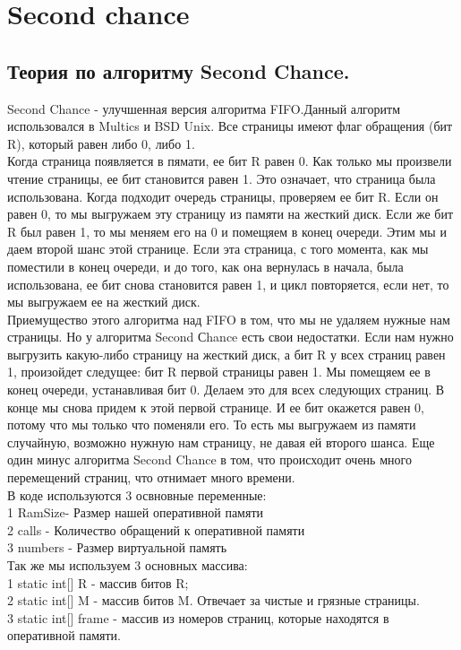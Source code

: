 \section{Second chance}

\subsection{Теория по алгоритму Second Chance.} 

Second Chance - улучшенная версия алгоритма FIFO.Данный алгоритм использовался в Multics и BSD Unix. Все страницы имеют флаг обращения (бит R), который равен либо 0, либо 1.\\
Когда страница появляется в пямати, ее бит R равен 0. Как только мы произвели чтение страницы, ее бит становится равен 1. Это означает, что страница была использована. Когда подходит очередь страницы, проверяем ее бит R. Если он равен 0, то мы выгружаем эту страницу из памяти на жесткий диск. Если же бит R был равен 1, то мы меняем его на 0 и помещяем в конец очереди. Этим мы и даем второй шанс этой странице. Если эта страница, с того момента, как мы поместили в конец очереди, и до того, как она вернулась в начала, была использована, ее бит снова становится равен 1, и цикл  повторяется, если нет, то мы выгружаем ее на жесткий диск.\\
 Приемущество этого алгоритма над FIFO в том, что мы не удаляем нужные нам страницы. Но у алгоритма Second Сhance есть свои недостатки. Если нам нужно выгрузить какую-либо страницу на жесткий диск, а бит R у всех страниц равен 1, произойдет следущее: бит R первой страницы равен 1. Мы помещяем ее в конец очереди, устанавливая бит 0. Делаем это для всех следующих страниц. В конце мы снова придем к этой первой странице. И ее бит окажется равен 0, потому что мы только что поменяли его. То есть мы выгружаем из памяти случайную, возможно нужную нам страницу, не давая ей второго шанса. Еще один минус алгоритма Second Chance  в том, что происходит очень много перемещений страниц, что отнимает много времени.\\
 В коде используются 3 освновные переменные: \\
 1 RamSize- Размер нашей оперативной памяти\\
 2 calls - Количество обращений к оперативной памяти \\
 3 numbers - Размер виртуальной память\\
Так же мы используем 3 основных массива:\\
   1  static int[] R - массив битов R;\\
   2 static int[] M - массив битов M. Отвечает за чистые и грязные страницы.\\
   3  static int[] frame - массив из номеров страниц, которые находятся в оперативной памяти.\\
    

